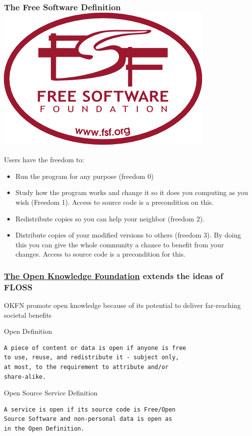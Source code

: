 \documentclass[hyperref={pdfpagelabels=false},xcolor=pst,pdf,fragile]{beamer}
\begin{document}
\begin{frame}
  \frametitle{The Free Software Definition \includegraphics[scale=0.09]{img/fsf.png}}

  Users have the freedom to:

  \begin{itemize}
	\item Run the program for any purpose (freedom 0)
	\pause
	\item Study how the program works and change it  so it does you
	  computing as you wish (Freedom 1). Access to source code is a
	  precondition on this.
	\pause
	\item Redistribute copies so you can help your neighbor (freedom 2).
	\pause
	\item Distribute copies of your modified versions to others (freedom
	  3). By doing this you can give the whole community a chance to
	  benefit from your changes. Access to source code is a precondition
	  for this.
  \end{itemize}

\end{frame}

\begin{frame}[fragile]
  \frametitle{
	  \href{http://okfn.org/}{The Open Knowledge Foundation}
  extends the ideas of FLOSS}

  OKFN promote open knowledge because of its potential to deliver
  far-reaching societal benefits

  \pause
  \begin{block}{Open Definition} %
	  \begin{lstlisting}
A piece of content or data is open if anyone is free
to use, reuse, and redistribute it - subject only,
at most, to the requirement to attribute and/or
share-alike.

	  \end{lstlisting}
  \end{block}

  \pause
  \begin{block}{Open Source Service Definition}
	  \begin{lstlisting}
A service is open if its source code is Free/Open
Source Software and non-personal data is open as
in the Open Definition.

	  \end{lstlisting}
  \end{block}

\end{frame}
\end{document}
